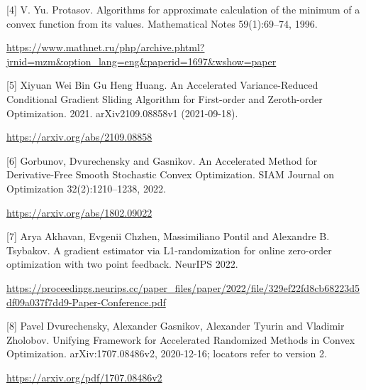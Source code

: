\documentclass[10pt,a4paper]{article}
\begin{document}
[4] V. Yu. Protasov. Algorithms for approximate calculation of the minimum of a convex function from its values. Mathematical Notes 59(1):69--74, 1996.

\url{https://www.mathnet.ru/php/archive.phtml?jrnid=mzm&option_lang=eng&paperid=1697&wshow=paper}

[5] Xiyuan Wei
Bin Gu
Heng Huang. An Accelerated Variance-Reduced Conditional Gradient Sliding Algorithm for First-order and Zeroth-order Optimization. 2021. arXiv2109.08858v1 (2021-09-18).

\url{https://arxiv.org/abs/2109.08858}

[6] Gorbunov, Dvurechensky and Gasnikov. An Accelerated Method for Derivative-Free Smooth Stochastic Convex Optimization. SIAM Journal on Optimization 32(2):1210--1238, 2022.

\url{https://arxiv.org/abs/1802.09022}

[7] Arya Akhavan, Evgenii Chzhen, Massimiliano Pontil and Alexandre B. Tsybakov. A gradient estimator via L1-randomization for online zero-order optimization with two point feedback. NeurIPS 2022.

\url{https://proceedings.neurips.cc/paper_files/paper/2022/file/329ef22fd8cb68223d5df09a037f7dd9-Paper-Conference.pdf}

[8] Pavel Dvurechensky, Alexander Gasnikov, Alexander Tyurin and Vladimir Zholobov. Unifying Framework for Accelerated Randomized Methods in Convex Optimization. arXiv:1707.08486v2, 2020-12-16; locators refer to version 2.

\url{https://arxiv.org/pdf/1707.08486v2}
\end{document}
